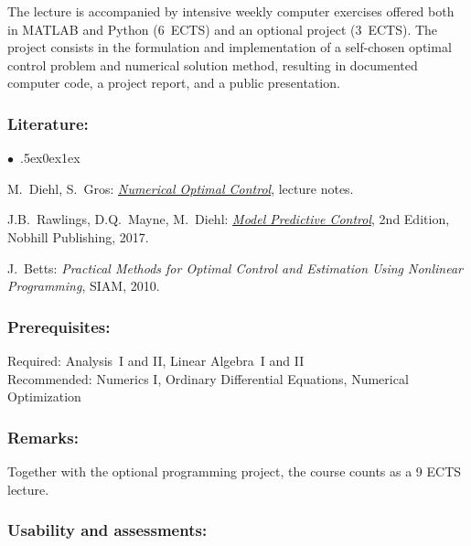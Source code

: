 \documentclass[a4paper,10pt]{article}
\renewenvironment{itemize}{\begin{list}{$\bullet$\ }{\itemsep.5ex\setlength{\topsep}{0.5\itemsep}\parsep0ex\labelsep1ex\settowidth{\labelwidth}{$\bullet$\ }\setlength{\leftmargin}{\labelwidth}\addtolength{\leftmargin}{3ex}\addtolength{\leftmargin}{\labelsep}}}{\end{list}}
\begin{document}
The lecture is accompanied by intensive weekly computer exercises offered both in MATLAB and Python (6~ECTS) and an optional project (3~ECTS). The project consists in the formulation and implementation of a self-chosen optimal control problem and numerical solution method, resulting in documented computer code, a project report, and a public presentation.
\subsubsection*{\large
    Literature:
}
\begin{itemize}
\item
 M.~Diehl, S.~Gros: \href{https://www.syscop.de/files/2020ss/NOC/book-NOCSE.pdf}{\emph{Numerical Optimal Control}}, lecture notes. 
\item
J.B.~Rawlings, D.Q.~Mayne, M.~Diehl: \href{https://sites.engineering.ucsb.edu/\~jbraw/mpc/MPC-book-2nd-edition-4th-printing.pdf}{\emph{Model Predictive Control}}, 2nd Edition, Nobhill Publishing, 2017.
\item
J.~Betts: \emph{Practical Methods for Optimal Control and Estimation Using Nonlinear Programming}, SIAM, 2010.
\end{itemize}
\subsubsection*{\large
    Prerequisites:
}
Required: Analysis~I and II, Linear Algebra~I and II \\
Recommended: Numerics I, Ordinary Differential Equations, Numerical Optimization
\subsubsection*{\large
    Remarks:
}
Together with the optional programming project, the course counts as a 9 ECTS lecture.
\cleardoublepage
\subsubsection*{\large
    Usability and assessments:
}
\end{document}
